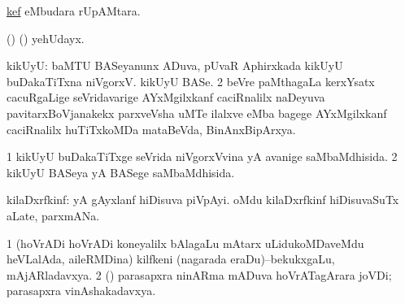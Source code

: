 \bentry
{}
\gl{\nA}
\bmng
 \hyperlink{kef}{kef} eMbudara rUpAMtara. 
\emng
\eentry

\bentry
{}
\gl{\nA}
\bmng
(\ame) (\ashi) yehUdayx. 
\emng
\eentry

\bentry
{}
\gl{\nA}
\bmng
\bnum
{} kikUyU: 
\banum
{} baMTU BASeyanunx ADuva, pUvaR Aphirxkada kikUyU buDakaTiTxna niVgorxV. 
 kikUyU BASe. 
\eanum
\numie
\num{2} beVre paMthagaLa kerxYsatx cacuRgaLige seVridavarige AYxMgilxkanf caciRnalilx naDeyuva pavitarxBoVjanakekx parxveVsha uMTe ilalxve eMba bagege AYxMgilxkanf caciRnalilx huTiTxkoMDa mataBeVda, BinAnxBipArxya. 
\enum
\emng
\eentry


\bentry
{}
\gl{\gu}
\bmng
\bnum
\num{1} kikUyU buDakaTiTxge seVrida niVgorxVvina yA avanige saMbaMdhisida. 
\num{2} kikUyU BASeya yA BASege saMbaMdhisida. 
\enum
\emng
\eentry

\bentry
{}
\gl{\nA}
\bmng
kilaDxrfkinf: 
\banum
{}  yA  gAyxlanf hiDisuva piVpAyi. 
 oMdu kilaDxrfkinf hiDisuvaSuTx aLate, parxmANa. 
\eanum
\emng
\eentry

\bentry
{}
\gl{\nA}
\bmng
\bnum
\num{1} (hoVrADi hoVrADi koneyalilx bAlagaLu mAtarx uLidukoMDaveMdu heVLalAda, aileRMDina) kilfkeni (nagarada eraDu)--bekukxgaLu, mAjARladavxya. 
\num{2} (\rUpa) parasapxra ninARma mADuva hoVrATagArara joVDi; parasapxra vinAshakadavxya. 
\enum
\emng
\eentry

